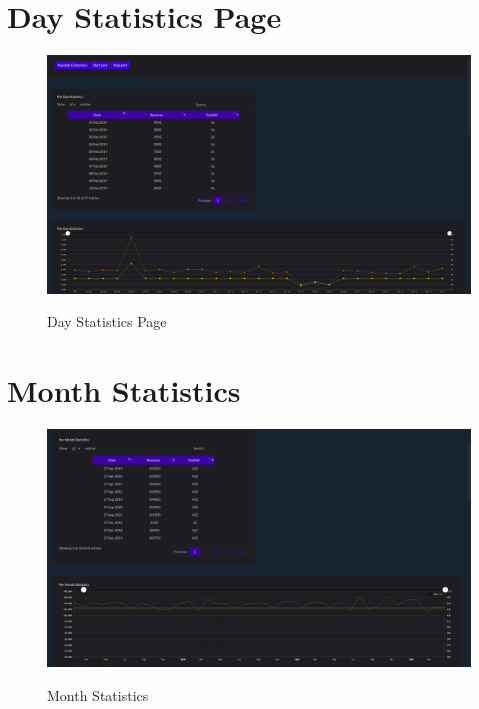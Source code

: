 \thispagestyle{fancy}


\section{Day Statistics Page}
\begin{figure}[H]
\centering
\caption{Day Statistics Page}
\includegraphics[scale=.22]{./day.png}
\\[0.2in]
\label{fig:Day Statistics Page}
\end{figure}

\thispagestyle{fancy}


\section{Month Statistics}
\begin{figure}[H]
\centering
\caption{Month Statistics}
\includegraphics[scale=.22]{./mth.png}
\\[0.2in]
\label{fig:Month Statistics}
\end{figure}

\thispagestyle{fancy}


